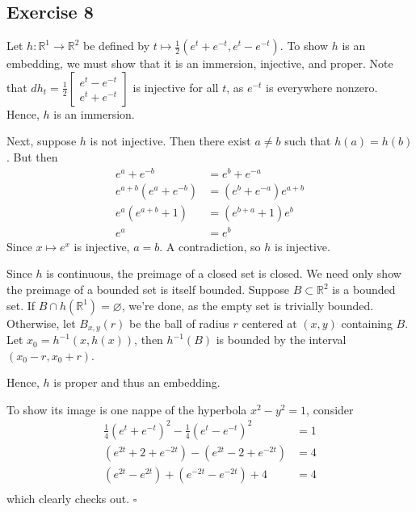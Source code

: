 \documentclass{article}
\newcommand{\R}{\mathbb{R}}
\begin{document}
\subsection*{Exercise 8}
Let $h\colon\R^1\to\R^2$ be defined by
$t\mapsto\frac{1}{2}(e^t+e^{-t}, e^t-e^{-t})$.
To show $h$ is an embedding, we must show that it is
an immersion, injective, and proper. Note that
$dh_t= \frac{1}{2}
\left[
	\begin{smallmatrix}
		e^t-e^{-t}\\
		e^t+e^{-t}
	\end{smallmatrix}
\right]$
is injective for all $t$, as $e^{-t}$ is everywhere nonzero.
Hence, $h$ is an immersion.

Next, suppose $h$ is not injective. Then there exist $a\ne b$
such that $h(a)=h(b)$. But then
\begin{align*}
	e^a+e^{-b} &= e^b+e^{-a}\\
	e^{a+b}(e^a+e^{-b}) &= (e^b+e^{-a})e^{a+b}\\
	e^a(e^{a+b}+1) &= (e^{b+a}+1)e^b\\
	e^a &= e^b
\end{align*}
Since $x\mapsto e^x$ is injective, $a=b$. A contradiction, so
$h$ is injective.

Since $h$ is continuous, the preimage of a closed set is closed.
We need only show the preimage of a bounded set is itself bounded.
Suppose $B\subset\R^2$ is a bounded set. If
$B\cap h(\R^1)=\varnothing$, we're done, as the empty set
is trivially bounded.
Otherwise, let $B_{x,y}(r)$ be the ball of radius $r$ centered at
$(x,y)$ containing $B$. Let $x_0 = h^{-1}(x, h(x))$, then
$h^{-1}(B)$ is bounded by the interval $(x_0-r,x_0+r)$.

Hence, $h$ is proper and thus an embedding.

To show its image is one nappe of the hyperbola $x^2-y^2=1$, consider
\begin{align*}
	\frac{1}{4}(e^t+e^{-t})^2-\frac{1}{4}(e^t-e^{-t})^2 &= 1\\
	(e^{2t}+2+e^{-2t})-(e^{2t}-2+e^{-2t}) &= 4\\
	(e^{2t}-e^{2t})+(e^{-2t}-e^{-2t})+4 &= 4\\
\end{align*}
which clearly checks out.
\hfill $\square$
\end{document}
